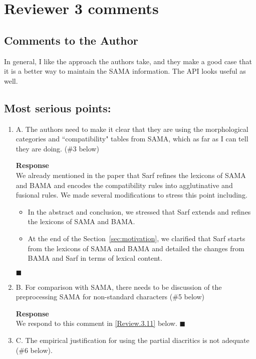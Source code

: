 \section*{Reviewer 3 comments} 

\subsection*{Comments to the Author}
In general, I like the approach the authors take, and they make a good case that it is a better way to maintain the
SAMA information. The API looks useful as well.

\subsection*{Most serious points:}
\begin{enumerate}[leftmargin=0mm,label=\bfseries CommentR3.\arabic*]
\item \label{Review.3.1}
A. The authors need to make it clear that they are using the morphological categories and ``compatibility" tables from SAMA, which as far as I can tell they are doing. (\#3 below)

\textbf{Response}\\
We already mentioned in the paper that Sarf refines the lexicons of SAMA and BAMA and encodes the compatibility rules into agglutinative
and fusional rules. 
We made several modifications to stress this point including.
\begin{itemize}
  \item In the abstract and conclusion, we stressed that Sarf extends and refines the lexicons of SAMA and BAMA. 
\item At the end of the Section~\ref{sec:motivation}, we clarified that Sarf starts from the lexicons of SAMA and BAMA and 
  detailed the changes from BAMA and Sarf in terms of lexical content. 
\end{itemize}
$\blacksquare$


\item \label{Review.3.2}
B. For comparison with SAMA, there needs to be discussion of the preprocessing SAMA for non-standard characters (\#5 below)

\textbf{Response}\\
We respond to this comment in \ref{Review.3.11} below. 
$\blacksquare$

\item \label{Review.3.3}
C. The empirical justification for using the partial diacritics is not adequate (\#6 below).


\end{enumerate}
